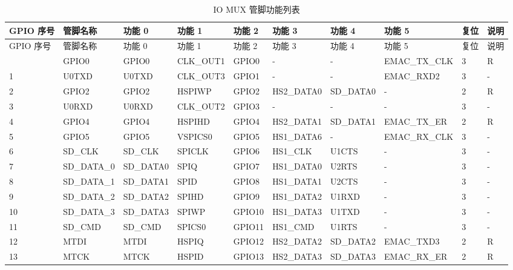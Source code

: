 \fontsize{8}{9}\selectfont
   \begin{longtable}[c]{|p{0.55cm}|p{1.8cm}|p{1.4cm}|p{1.4cm}|p{1.4cm}|p{1.6cm}|p{1.4cm}|p{2.0cm}|p{0.55cm}|p{0.55cm}| }
   \caption{IO MUX 管脚功能列表}
    \label{table:iomux_pads}
        \\\hline
        \rowcolor{lightgray}
GPIO 序号 & 管脚名称 & 功能 0 & 功能 1 & 功能 2 & 功能 3 & 功能 4 & 功能 5 & 复位 & 说明 \\
 \hline
\endfirsthead
        \hline
        \rowcolor{lightgray}
        GPIO 序号 & 管脚名称 & 功能 0 & 功能 1 & 功能 2 & 功能 3 & 功能 4 & 功能 5 & 复位 & 说明 \\
        \hline
        \endhead
        \endfoot
0 & GPIO0    & GPIO0    & CLK\_OUT1 & GPIO0    & -        & -        & EMAC\_TX\_CLK & 3 & R \\
\hline
1 & U0TXD    & U0TXD    & CLK\_OUT3 & GPIO1    & -        & -        & EMAC\_RXD2 & 3 & - \\
\hline
2 & GPIO2    & GPIO2    & HSPIWP   & GPIO2    & HS2\_DATA0 & SD\_DATA0 & -        & 2 & R \\
\hline
3 & U0RXD    & U0RXD    & CLK\_OUT2 & GPIO3    & -        & -        & -        & 3 & - \\
\hline
4 & GPIO4    & GPIO4    & HSPIHD   & GPIO4    & HS2\_DATA1 & SD\_DATA1 & EMAC\_TX\_ER & 2 & R \\
\hline
5 & GPIO5    & GPIO5    & VSPICS0  & GPIO5    & HS1\_DATA6 & -        & EMAC\_RX\_CLK & 3 & - \\
\hline
6 & SD\_CLK  & SD\_CLK  & SPICLK   & GPIO6    & HS1\_CLK & U1CTS    & -        & 3 & - \\
\hline
7 & SD\_DATA\_0 & SD\_DATA0 & SPIQ     & GPIO7    & HS1\_DATA0 & U2RTS    & -        & 3 & - \\
\hline
8 & SD\_DATA\_1 & SD\_DATA1 & SPID     & GPIO8    & HS1\_DATA1 & U2CTS    & -        & 3 & - \\
\hline
9 & SD\_DATA\_2 & SD\_DATA2 & SPIHD    & GPIO9    & HS1\_DATA2 & U1RXD    & -        & 3 & - \\
\hline
10 & SD\_DATA\_3 & SD\_DATA3 & SPIWP    & GPIO10   & HS1\_DATA3 & U1TXD    & -        & 3 & - \\
\hline
11 & SD\_CMD  & SD\_CMD  & SPICS0   & GPIO11   & HS1\_CMD & U1RTS    & -        & 3 & - \\
\hline
12 & MTDI     & MTDI     & HSPIQ    & GPIO12   & HS2\_DATA2 & SD\_DATA2 & EMAC\_TXD3 & 2 & R \\
\hline
13 & MTCK     & MTCK     & HSPID    & GPIO13   & HS2\_DATA3 & SD\_DATA3 & EMAC\_RX\_ER & 2 & R \\

\end{longtable}
